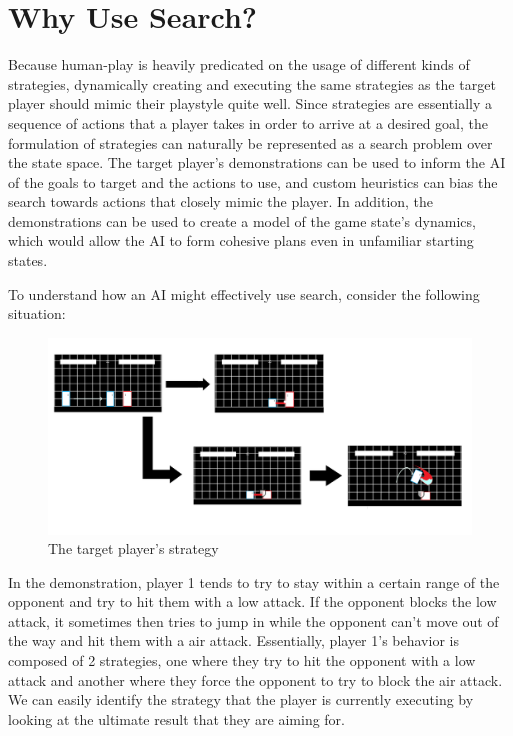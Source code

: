 \section{Why Use Search?}

Because human-play is heavily predicated on the usage of different kinds of strategies, dynamically creating and executing the same strategies as the target player should mimic their playstyle quite well. Since strategies are essentially a sequence of actions that a player takes in order to arrive at a desired goal, the formulation of strategies can naturally be represented as a search problem over the state space. The target player's demonstrations can be used to inform the AI of the goals to target and the actions to use, and custom heuristics can bias the search towards actions that closely mimic the player. In addition, the demonstrations can be used to create a model of the game state's dynamics, which would allow the AI to form cohesive plans even in unfamiliar starting states. 

To understand how an AI might effectively use search, consider the following situation:

\begin{figure}[h]
	\centering
	\includegraphics[width=\textwidth]{Figures/Flowchart.png}
	\caption{The target player's strategy}
	\label{Player Strategy}
\end{figure}

In the demonstration, player 1 tends to try to stay within a certain range of the opponent and try to hit them with a low attack. If the opponent blocks the low attack, it sometimes then tries to jump in while the opponent can't move out of the way and hit them with a air attack. Essentially, player 1's behavior is composed of 2 strategies, one where they try to hit the opponent with a low attack and another where they force the opponent to try to block the air attack. We can easily identify the strategy that the player is currently executing by looking at the ultimate result that they are aiming for.

